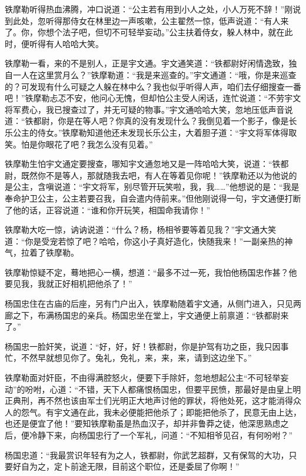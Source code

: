 \documentclass[12pt,oneside]{book}
\begin{document}
铁摩勒听得热血沸腾，冲口说道：``公主若有用到小人之处，小人万死不辞！''刚说到此处，忽听得那侍女在林里边一声咳嗽，公主翟然一惊，低声说道：``有人来了。你，你想个法子吧，但切不可轻举妄动。''公主扶着侍女，躲人林中，就在此时，便听得有人哈哈大笑。

铁摩勒一看，来的不是别人，正是宇文通。宇文通笑道：``铁都尉好闲情逸致，独自一人在这里赏月么？''铁摩勒道：``我是来巡查的。''宇文通道：``哦，你是来巡查的？可发现有什么可疑之人躲在林中么？我也似乎听得人声，咱们去仔细搜查一番吧！''铁摩勒忐忑不安，他问心无愧，但却怕公主受人闲话，连忙说道：``不劳宇文将军费心，我已搜查过了，并无可疑的物事。''宇文通哈哈大笑，忽地压低声音说道：``铁都尉，你是在等人吧？你真的没有发现什么？我倒见着一个影子，像是长乐公主的侍女。''铁摩勒知道他还未发现长乐公主，大着胆子道：``宇文将军体得取笑。怕是你眼花了吧？我怎么没有见着。''

铁摩勒生怕宇文通定要搜查，哪知宇文通忽地又是一阵哈哈大笑，说道：``铁都尉，既然你不是等人，那就随我去吧，有人在等着见你呢！''铁摩勒还以为他说的是公主，含嗔说道：``宇文将军，别尽管开玩笑啦，我，我\ldots\ldots{}''他想说的是：``我是奉命护卫公主，公主若要召我，自会遣内侍前来。''但他刚说得一句，宇文通便打断了他的话，正容说道：``谁和你开玩笑，相国命我请你！''

铁摩勒大吃一惊，讷讷说道：``什么？杨，杨相爷要等着见我？''宇文通大笑道：``你是受宠若惊了吧？哈哈，你这小子真好造化，快随我来！''一副亲热的神气，拉着了铁摩勒。

铁摩勒惊疑不定，蓦地把心一横，想道：``最多不过一死，我怕他杨国忠作甚？他要见我，我就正好相机把他杀了！''

杨国忠住在古庙的后座，另有门户出入，铁摩勒随着宇文通，从侧门进入，只见两廊之下，布满杨国忠的亲兵。杨国忠坐在堂上，宇文通便上前禀道：``铁都尉来了。''

杨国忠一脸奸笑，说道：``好，好，好！铁都尉，你是护驾有功之臣，我只因事忙，不然早就想见你了。兔礼，免礼，来，来，来，请到这边坐下。''

铁摩勒面对奸臣，不由得满腔怒火，便要下手除奸，忽地想起公主``不可轻举妄动''的吩咐，心道：``不错，天下人都痛恨杨国忠，但要平民愤，那最好是由皇上明正典刑，再不然也该由军士们光明正大地声讨他的罪状，将他处死，这才能消得众人的怨气。有宇文通在此，我未必便能把他杀了；即能把他杀了，民意无由上达，也还是便宜了他！''要知铁摩勒虽是热血汉子，却并非鲁莽之徒，他深思熟虑之后，便冷静下来，向杨国忠行了一个军礼，问道：``不知相爷见召，有何吩咐？''

杨国忠道：``我最赏识年轻有为之人，铁都尉，你武艺超群，又有保驾的大功，只要好自为之，定卜前途无限，目前这个职位，还是委屈了你啊！''
\end{document}
